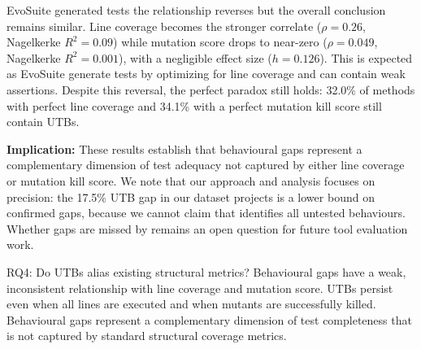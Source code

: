 EvoSuite generated tests the relationship reverses but the overall conclusion remains similar. Line coverage becomes the stronger correlate ($\rho=0.26$, Nagelkerke $R^2=0.09$) while mutation score drops to near-zero ($\rho=0.049$, Nagelkerke $R^2=0.001$), with a negligible effect size ($h=0.126$). This is expected as EvoSuite generate tests by optimizing for line coverage and can contain weak assertions. Despite this reversal, the perfect paradox still holds: 32.0\% of methods with perfect line coverage and 34.1\% with a perfect mutation kill score still contain UTBs.

\smallskip
\noindent\textbf{Implication:} These results establish that behavioural gaps represent a complementary dimension of test adequacy not captured by either line coverage or mutation kill score. We note that our approach and analysis focuses on precision: the 17.5\% UTB gap in our dataset projects is a lower bound on confirmed gaps, because we cannot claim that \toolname{} identifies all untested behaviours. 
Whether gaps are missed by \toolname remains an open question for future tool evaluation work. 


\begin{rqbox}{RQ4: Do UTBs alias existing structural metrics?}
Behavioural gaps have a weak, inconsistent relationship with line coverage and mutation score. 
UTBs persist even when all lines are executed and when mutants are successfully killed.
Behavioural gaps represent a complementary dimension of test completeness that is not captured by standard structural coverage metrics.
\end{rqbox}
